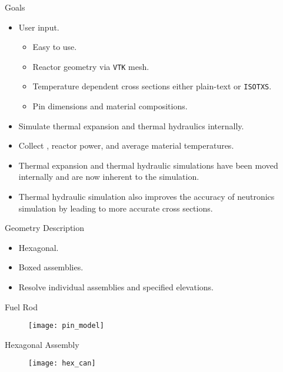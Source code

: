 \begin{frame}{Goals}
  \begin{itemize}
    \item User input.
      \begin{itemize}
        \item Easy to use.
        \item Reactor geometry via \texttt{VTK} mesh.
        \item Temperature dependent cross sections either plain-text or 
          \texttt{ISOTXS}.
        \item Pin dimensions and material compositions.
      \end{itemize}
    \item Simulate thermal expansion and thermal hydraulics internally.
    \item Collect \keff, reactor power, and average material temperatures.
  \end{itemize}
  \vspace{0.25in}
  \begin{itemize}
    \item Thermal expansion and thermal hydraulic simulations have been moved
      internally and are now inherent to the simulation.
    \item Thermal hydraulic simulation also improves the accuracy of neutronics
      simulation by leading to more accurate cross sections.
  \end{itemize}
\end{frame}

\begin{frame}{Geometry Description}
  \begin{itemize}
    \item Hexagonal.
    \item Boxed assemblies.
    \item Resolve individual assemblies and specified elevations.
  \end{itemize}
\end{frame}

\begin{frame}{Fuel Rod}
  \begin{figure}
    \centering
    \texttt{[image: pin\_model]}
    \label{fig:pin_model}
  \end{figure}
\end{frame}

\begin{frame}{Hexagonal Assembly}
  \begin{figure}
    \centering
    \texttt{[image: hex\_can]}
    \label{fig:hex_can}
  \end{figure}
\end{frame}

